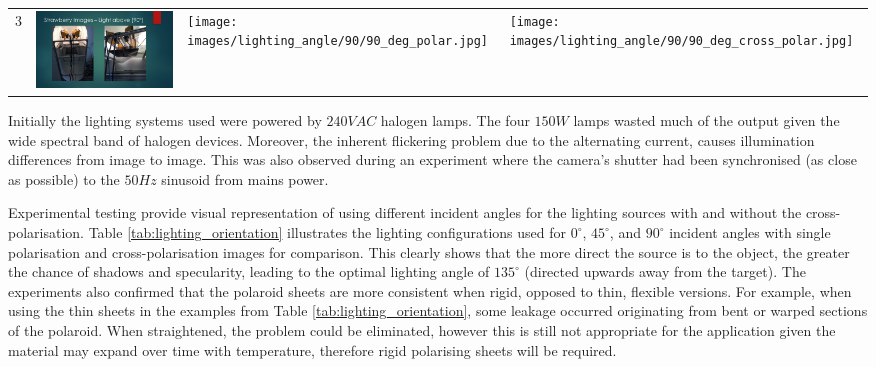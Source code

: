 \documentclass[fleqn,twoside,12pt]{report}
\begin{document}
\begin{table}[h]
\begin{tabular}{c*3{I}}
		3 &
		\includegraphics[width=\linewidth]{images/lighting_angle/90/90_degrees_setup.pdf} & \texttt{[image: images/lighting\_angle/90/90\_deg\_polar.jpg]} & \texttt{[image: images/lighting\_angle/90/90\_deg\_cross\_polar.jpg]} \\
		
	\end{tabular}
\end{table} 

Initially the lighting systems used were powered by $240VAC$ halogen lamps. The four $150W$ lamps wasted much of the output given the wide spectral band of halogen devices. Moreover, the inherent flickering problem due to the alternating current, causes illumination differences from image to image. This was also observed during an experiment where the camera's shutter had been synchronised (as close as possible) to the $50Hz$ sinusoid from mains power.

Experimental testing provide visual representation of using different incident angles for the lighting sources with and without the cross-polarisation. Table \ref{tab:lighting_orientation} illustrates the lighting configurations used for $0^{\circ}$, $45^{\circ}$, and $90^{\circ}$ incident angles with single polarisation and cross-polarisation images for comparison. This clearly shows that the more direct the source is to the object, the greater the chance of shadows and specularity, leading to the optimal lighting angle of $135^{\circ}$ (directed upwards away from the target). The experiments also confirmed that the polaroid sheets are more consistent when rigid, opposed to thin, flexible versions. For example, when using the thin sheets in the examples from Table \ref{tab:lighting_orientation}, some leakage occurred originating from bent or warped sections of the polaroid. When straightened, the problem could be eliminated, however this is still not appropriate for the application given the material may expand over time with temperature, therefore rigid polarising sheets will be required.
\end{document}
